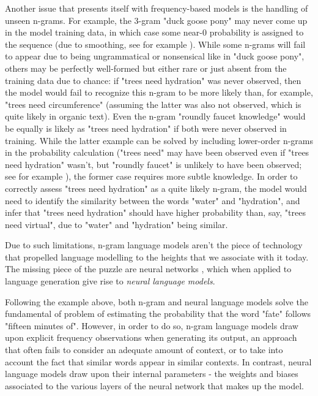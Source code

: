 Another issue that presents itself with frequency-based models is the handling of unseen n-grams. For example, the 3-gram "duck goose pony" may never come up in the model training data, in which case some near-0 probability is assigned to the sequence (due to smoothing, see for example \citealp{citationneeded}).
While some n-grams will fail to appear due to being ungrammatical or nonsensical like in "duck goose pony", others may be perfectly well-formed but either rare or just absent from the training data due to chance: if "trees need hydration" was never observed, then the model would fail to recognize this n-gram to be more likely than, for example, "trees need circumference" (assuming the latter was also not observed, which is quite likely in organic text).
Even the n-gram "roundly faucet knowledge" would be equally is likely as "trees need hydration" if both were never observed in training. While the latter example can be solved by including lower-order n-grams in the probability calculation ("trees need" may have been observed even if "trees need hydration" wasn't, but "roundly faucet" is unlikely to have been observed; see for example \citealp{citationneeded}), the former case requires more subtle knowledge.
In order to correctly assess "trees need hydration" as a quite likely n-gram, the model would need to identify the similarity between the words "water" and "hydration", and infer that "trees need hydration" should have higher probability than, say, "trees need virtual", due to "water" and "hydration" being similar.

Due to such limitations, n-gram language models aren't the piece of technology that propelled language modelling to the heights that we associate with it today.
The missing piece of the puzzle are neural networks \citep{citationneeded}, which when applied to language generation give rise to \emph{neural language models}. \citep{citationneeded}

Following the example above, both n-gram and neural language models solve the fundamental of problem of estimating the probability that the word "fate" follows "fifteen minutes of".
However, in order to do so, n-gram language models draw upon explicit frequency observations when generating its output, an approach that often fails to consider an adequate amount of context, or to take into account the fact that similar words appear in similar contexts.
In contrast, neural language models draw upon their internal parameters - the weights and biases \citep{citationneeded} associated to the various layers of the neural network that makes up the model. \citep{citationneeded}

